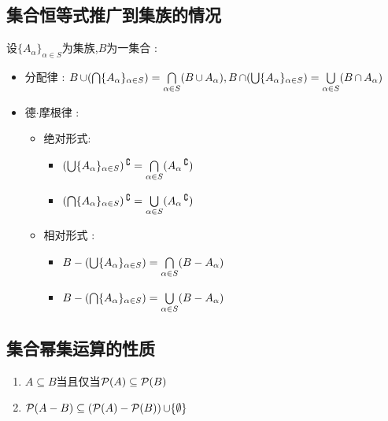 {{\subsection{集合恒等式推广到集族的情况}{
设$\{A_\alpha\}_{\alpha \in S}$为集族,$B$为一集合 :

\begin{itemize}
  \item 分配律 : $B \unionSet (\updownIntersection{~}{~}\{A_\alpha\}_{\alpha \in S}) = \updownIntersection{~}{\alpha \in S}(B \unionSet A_\alpha),B \intersectionSet (\updownUnion{~}{~}\{A_\alpha\}_{\alpha \in S}) = \updownUnion{~}{\alpha \in S}(B \intersectionSet A_\alpha)$
  \item 德$\cdot$摩根律 : \begin{itemize}
          \item 绝对形式: \begin{itemize}
                  \item $(\updownUnion{~}{~}\{A_\alpha\}_{\alpha \in S})\absoluteCompletementSet = \updownIntersection{~}{\alpha \in S}(A_\alpha\absoluteCompletementSet)$
                  \item$(\updownIntersection{~}{~}\{A_\alpha\}_{\alpha \in S})\absoluteCompletementSet = \updownUnion{~}{\alpha \in S}(A_\alpha\absoluteCompletementSet)$
                \end{itemize}
          \item 相对形式 : \begin{itemize}
                  \item $B - (\updownUnion{~}{~}\{A_\alpha\}_{\alpha \in S}) = \updownIntersection{~}{\alpha \in S}(B - A_\alpha)$
                  \item $B - (\updownIntersection{~}{~}\{A_\alpha\}_{\alpha \in S}) = \updownUnion{~}{\alpha \in S}(B - A_\alpha)$
                \end{itemize}
        \end{itemize}
\end{itemize}
}%

\subsection{集合幂集运算的性质}{
  \begin{enumerate}
    \item $A \subseteq B$当且仅当$\powerSetOf{A} \subseteq \powerSetOf{B}$
    \item $\powerSetOf{A - B} \subseteq (\powerSetOf{A} - \powerSetOf{B}) \unionSet \{\emptyset\}$
  \end{enumerate}
}%

}}
